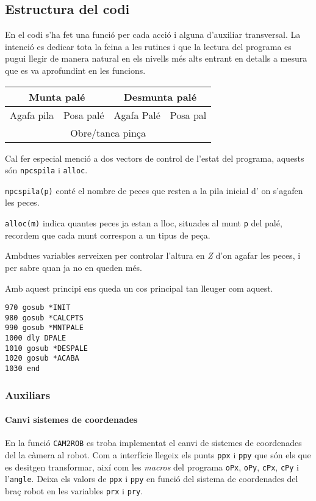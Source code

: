\subsection{Estructura del codi}
En el codi s'ha fet una funció per cada acció i alguna d'auxiliar transversal.
La intenció es dedicar tota la feina a les rutines i que la lectura del
programa es pugui llegir de manera natural en els nivells més alts entrant en
detalls a mesura que es va aprofundint en les funcions.

\begin{center}
\begin{tabular}{|l|l|l|l|}
\hline
\multicolumn{2}{|c|}{Munta palé} & \multicolumn{2}{|c|}{Desmunta palé}\\
\hline
Agafa pila & Posa palé & Agafa Palé & Posa pal\\
\hline
\multicolumn{4}{|c|}{Obre/tanca pinça}\\
\hline
\end{tabular}
\end{center}


Cal fer especial menció a dos vectors de control de l'estat del programa,
aquests són \texttt{npcspila} i \texttt{alloc}.

\texttt{npcspila(p)} conté el nombre de peces que resten a la pila inicial d'
on s'agafen les peces.

\texttt{alloc(m)} indica quantes peces ja estan a lloc, situades al munt
\texttt{p} del palé, recordem que cada munt correspon a un tipus de peça.

Ambdues variables serveixen per controlar l'altura en \emph{Z} d'on agafar les
peces, i per sabre quan ja no en queden més.

Amb aquest principi ens queda un cos principal tan lleuger com aquest.
\begin{verbatim}
970 gosub *INIT
980 gosub *CALCPTS
990 gosub *MNTPALE
1000 dly DPALE
1010 gosub *DESPALE
1020 gosub *ACABA
1030 end
\end{verbatim}

\subsubsection{Auxiliars}
\paragraph{Canvi sistemes de coordenades}\label{cam2rob}
En la funció \texttt{CAM2ROB} es troba implementat el canvi de sistemes
de coordenades del la càmera al robot.
Com a interfície llegeix els punts \texttt{ppx} i \texttt{ppy} que són els que es desitgen
transformar, així com les \emph{macros} del programa \texttt{oPx}, \texttt{oPy},
\texttt{cPx}, \texttt{cPy} i l'\texttt{angle}. Deixa els valors de
\texttt{ppx} i \texttt{ppy} en funció del sistema de coordenades del braç
robot en les variables \texttt{prx} i \texttt{pry}.

